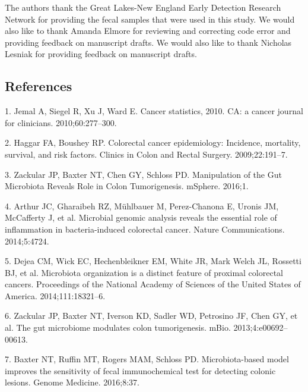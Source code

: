 \documentclass[12pt,]{article}
\begin{document}
The authors thank the Great Lakes-New England Early Detection Research
Network for providing the fecal samples that were used in this study. We
would also like to thank Amanda Elmore for reviewing and correcting code
error and providing feedback on manuscript drafts. We would also like to
thank Nicholas Lesniak for providing feedback on manuscript drafts.

\newpage

\subsection*{References}\label{references}

\hypertarget{refs}{}
\hypertarget{ref-jemal_cancer_2010}{}
1. Jemal A, Siegel R, Xu J, Ward E. Cancer statistics, 2010. CA: a
cancer journal for clinicians. 2010;60:277--300.

\hypertarget{ref-haggar_colorectal_2009}{}
2. Haggar FA, Boushey RP. Colorectal cancer epidemiology: Incidence,
mortality, survival, and risk factors. Clinics in Colon and Rectal
Surgery. 2009;22:191--7.

\hypertarget{ref-zackular_manipulation_2016}{}
3. Zackular JP, Baxter NT, Chen GY, Schloss PD. Manipulation of the Gut
Microbiota Reveals Role in Colon Tumorigenesis. mSphere. 2016;1.

\hypertarget{ref-arthur_microbial_2014}{}
4. Arthur JC, Gharaibeh RZ, Mühlbauer M, Perez-Chanona E, Uronis JM,
McCafferty J, et al. Microbial genomic analysis reveals the essential
role of inflammation in bacteria-induced colorectal cancer. Nature
Communications. 2014;5:4724.

\hypertarget{ref-dejea_microbiota_2014}{}
5. Dejea CM, Wick EC, Hechenbleikner EM, White JR, Mark Welch JL,
Rossetti BJ, et al. Microbiota organization is a distinct feature of
proximal colorectal cancers. Proceedings of the National Academy of
Sciences of the United States of America. 2014;111:18321--6.

\hypertarget{ref-zackular_gut_2013}{}
6. Zackular JP, Baxter NT, Iverson KD, Sadler WD, Petrosino JF, Chen GY,
et al. The gut microbiome modulates colon tumorigenesis. mBio.
2013;4:e00692--00613.

\hypertarget{ref-baxter_microbiota-based_2016}{}
7. Baxter NT, Ruffin MT, Rogers MAM, Schloss PD. Microbiota-based model
improves the sensitivity of fecal immunochemical test for detecting
colonic lesions. Genome Medicine. 2016;8:37.
\end{document}
